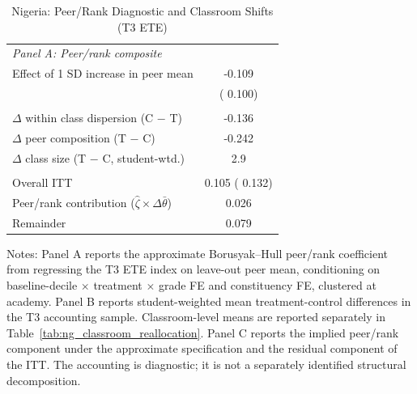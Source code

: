 \begin{table}[!htbp]
\centering
\caption{Nigeria: Peer/Rank Diagnostic and Classroom Shifts (T3 ETE)}
\label{tab:ng_suffstat}
\begin{threeparttable}
\begin{tabular}[t]{lc}
\toprule
\multicolumn{2}{l}{\textit{Panel A: Peer/rank composite}} \\
Effect of 1 SD increase in peer mean &  -0.109 \\
 & (  0.100) \\
\addlinespace
\multicolumn{2}{l}{\textit{Panel B: Treatment-induced shifts}} \\
$\Delta$ within class dispersion (C $-$ T) &  -0.136 \\
$\Delta$ peer composition (T $-$ C) &  -0.242 \\
$\Delta$ class size (T $-$ C, student-wtd.) &   2.9 \\
\addlinespace
\multicolumn{2}{l}{\textit{Panel C: Diagnostic accounting}} \\
Overall ITT &   0.105 (  0.132) \\
Peer/rank contribution ($\hat{\zeta} \times \Delta\bar{\theta}$) &   0.026 \\
Remainder &   0.079 \\
\bottomrule
\end{tabular}
\begin{tablenotes}[para]
\item Notes: Panel A reports the approximate Borusyak--Hull peer/rank coefficient from regressing the T3 ETE index on leave-out peer mean, conditioning on baseline-decile $\times$ treatment $\times$ grade FE and constituency FE, clustered at academy. Panel B reports student-weighted mean treatment-control differences in the T3 accounting sample. Classroom-level means are reported separately in Table~\ref{tab:ng_classroom_reallocation}. Panel C reports the implied peer/rank component under the approximate specification and the residual component of the ITT. The accounting is diagnostic; it is not a separately identified structural decomposition.
\end{tablenotes}
\end{threeparttable}
\end{table}

